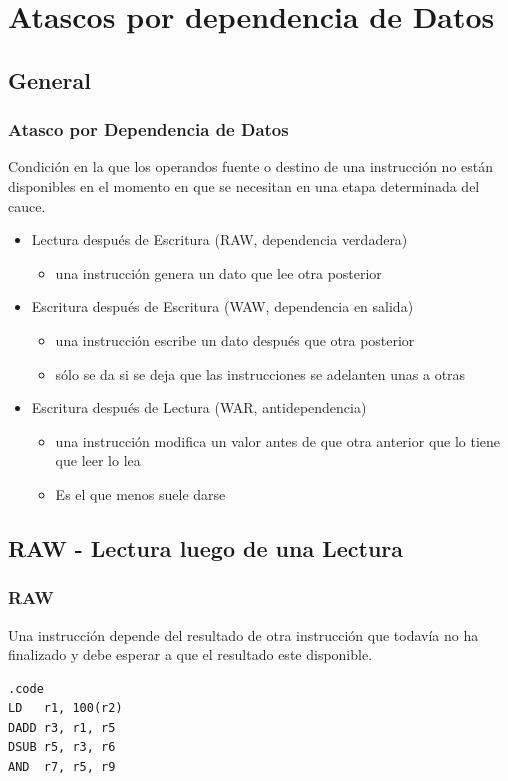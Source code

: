 \documentclass{beamer}
\begin{document}
\section{Atascos por dependencia de Datos}
\subsection{General}

\begin{frame}
\frametitle{Atasco por Dependencia de Datos}

Condición en la que los operandos fuente o destino de una instrucción no están disponibles en el momento en que se necesitan en una etapa determinada del cauce.
\begin{itemize}

\item Lectura después de Escritura (RAW, dependencia verdadera)
\begin{itemize}
\item  una instrucción genera un dato que lee otra posterior
\end{itemize}

\item Escritura después de Escritura (WAW, dependencia en salida)
\begin{itemize}
\item una instrucción escribe un dato después que otra posterior
\item sólo se da si se deja que las instrucciones se adelanten unas a otras
\end{itemize}

\item Escritura después de Lectura (WAR, antidependencia)
\begin{itemize}
\item una instrucción modifica un valor antes de que otra anterior que lo tiene que leer lo lea
\item Es el que menos suele darse
\end{itemize}
\end{itemize}
\end{frame}

\subsection{RAW - Lectura luego de una Lectura}
\begin{frame}[fragile]
\frametitle{RAW}
Una instrucción depende del resultado de otra instrucción que todavía no ha finalizado y debe esperar a que el resultado este disponible.
\begin{block}{}
\begin{lstlisting}[basicstyle=\ttfamily,keywordstyle=\color{blue}]
.code
LD   r1, 100(r2)
DADD r3, r1, r5
DSUB r5, r3, r6
AND  r7, r5, r9
\end{lstlisting}
\end{block}

\end{frame}
\end{document}
